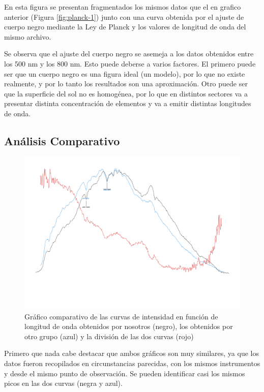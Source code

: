 \documentclass[11pt, a4paper]{article}
\begin{document}
En esta figura se presentan fragmentados los mismos datos que el en grafico anterior (Figura \ref{fig:planck-1}) junto con una curva obtenida por el ajuste de cuerpo negro mediante la Ley de Planck y los valores de longitud de onda del mismo archivo.

Se observa que el ajuste del cuerpo negro se asemeja a los datos obtenidos entre los 500 nm y los 800 nm. Esto puede deberse a varios factores. El primero puede ser que un cuerpo negro es una figura ideal (un modelo), por lo que no existe realmente, y por lo tanto los resultados son una aproximación. Otro puede ser que la superficie del sol no es homogénea, por lo que en distintos sectores va a presentar distinta concentración de elementos y va a emitir distintas longitudes de onda. 


\subsection{Análisis Comparativo}
\begin{figure}[H]
    \centering
    \includegraphics[width=1\linewidth]{images/division_perfiles_page-0001.jpg}
    \captionsetup{justification=centering}
    \caption{Gráfico comparativo de las curvas de intensidad en función de longitud de onda obtenidos por nosotros (negro), los obtenidos por otro grupo (azul) y la división de las dos curvas (rojo)}
    \label{fig:graf-comparativo}
\end{figure}

Primero que nada cabe destacar que ambos gráficos son muy similares, ya que los datos fueron recopilados en circunstancias parecidas, con los mismos instrumentos y desde el mismo punto de observación. Se pueden identificar casi los mismos picos en las dos curvas (negra y azul). 
\end{document}
